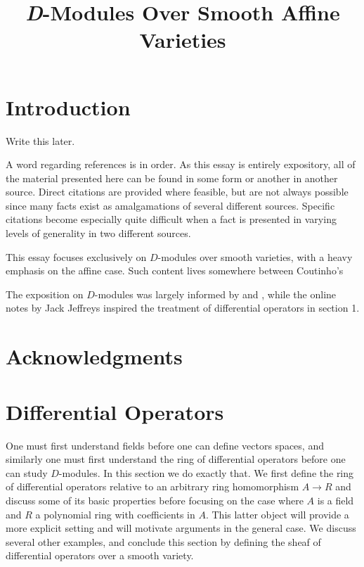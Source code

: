 
\usepackage{indentfirst}

\title{\textit{D}-Modules Over Smooth Affine Varieties}
\date{}

\usepackage{titling}
\renewcommand\maketitlehooka{\null\mbox{}\vfill}
\renewcommand\maketitlehookd{\vfill\null}

\maketitle

\newpage

\tableofcontents
\newpage
\section*{Introduction}
Write this later.

A word regarding references is in order. As this essay is entirely expository, all of the material presented here can be found in some form or another in another source. Direct citations are provided where feasible, but are not always possible since many facts exist as amalgamations of several different sources. Specific citations become especially quite difficult when a fact is presented in varying levels of generality in two different sources. 

This essay focuses exclusively on $D$-modules over smooth varieties, with a heavy emphasis on the affine case. Such content lives somewhere between Coutinho's 

The exposition on $D$-modules was largely informed by \cite{d-mod-primer} and \cite{d-mod_ps-rt}, while the online notes \cite{jeffries_d-mod} by Jack Jeffreys inspired the treatment of differential operators in section 1. 

\section*{Acknowledgments}
\newpage
\section{Differential Operators}
One must first understand fields before one can define vectors spaces, and similarly one must first understand the ring of differential operators before one can study $D$-modules. In this section we do exactly that. We first define the ring of differential operators relative to an arbitrary ring homomorphism $A\to R$ and discuss some of its basic properties before focusing on the case where $A$ is a field and $R$ a polynomial ring with coefficients in $A$. This latter object will provide a more explicit setting and will motivate arguments in the general case. We discuss several other examples, and conclude this section by defining the sheaf of differential operators over a smooth variety.

